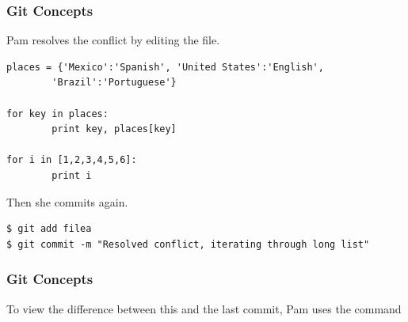 \begin{frame}[fragile]\frametitle{Git Concepts}
    Pam resolves the conflict by editing the file.

    \vspace{0.5cm}
    \newbox{\mybox}
    \begin{lrbox}{\mybox}
    \begin{minipage}{\linewidth}
    \begin{lstlisting}[basicstyle=\tiny\ttfamily\color{white}]
places = {'Mexico':'Spanish', 'United States':'English',
        'Brazil':'Portuguese'}

for key in places:
        print key, places[key]

for i in [1,2,3,4,5,6]:
        print i
    \end{lstlisting}
    \end{minipage}
    \end{lrbox}
    \colorbox{black}{\usebox{\mybox}}

    \vspace{0.5cm}
    Then she commits again.

    \vspace{0.5cm}
    \newbox{\mybox}
    \begin{lrbox}{\mybox}
    \begin{minipage}{\linewidth}
    \begin{lstlisting}[basicstyle=\tiny\ttfamily\color{white}]
$ git add filea
$ git commit -m "Resolved conflict, iterating through long list"
    \end{lstlisting}
    \end{minipage}
    \end{lrbox}
    \colorbox{black}{\usebox{\mybox}}
\end{frame}

\begin{frame}[fragile]\frametitle{Git Concepts}
    To view the difference between this and the last
    commit, Pam uses the command 

    \begin{center} 
        \begin{figure}[h!] \centering
        \end{figure}
    \end{center}
\end{frame}

